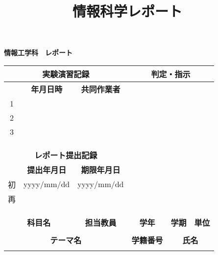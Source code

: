 \documentclass[a4paper]{jsarticle}
\title{情報科学レポート}
\author{}
\begin{document}
{\Huge\begin{center}
  \textbf{情報工学科　レポート}
\end{center}}
\begin{table}[h]
  \centering
  \begingroup
  \renewcommand{\arraystretch}{1.3}
  {\LARGE
  \begin{tabular}{|c|c|c|c|c|c|}
    \hline
    \multicolumn{3}{|c|}{\textbf{実験演習記録}}&\multicolumn{3}{|c|}{\textbf{判定・指示}}\\ \hline
    \hspace{20truemm}&\textbf{年月日時}&\textbf{共同作業者}&\multicolumn{3}{|@{\hspace{6cm}}|}{}\\ \cline{1-3}
    1&&&\multicolumn{3}{|@{\hspace{6cm}}|}{}\\ \cline{1-3}
    2&&&\multicolumn{3}{|@{\hspace{6cm}}|}{}\\ \cline{1-3}
    3&&&\multicolumn{3}{|@{\hspace{6cm}}|}{}\\ \cline{1-3}
    &&&\multicolumn{3}{|@{\hspace{6cm}}|}{}\\ \cline{1-3}
    &&&\multicolumn{3}{|@{\hspace{6cm}}|}{}\\ \cline{1-3}
    &&&\multicolumn{3}{|@{\hspace{6cm}}|}{}\\ \cline{1-3}
    \multicolumn{3}{|c|}{\textbf{レポート提出記録}}&\multicolumn{3}{|@{\hspace{6cm}}|}{}\\ \cline{1-3}
    \hspace{1cm}&\textbf{提出年月日}&\textbf{期限年月日}&\multicolumn{3}{|@{\hspace{6cm}}|}{}\\ \cline{1-3}
    初&yyyy/mm/dd&yyyy/mm/dd&\multicolumn{3}{|@{\hspace{6cm}}|}{}\\ \cline{1-3}
    再&&&\multicolumn{3}{|@{\hspace{6cm}}|}{}\\ \cline{1-3}
    &&&\multicolumn{3}{|@{\hspace{6cm}}|}{}\\ \cline{1-3}
    &&&\multicolumn{3}{|@{\hspace{6cm}}|}{}\\ \cline{1-3}
    &&&\multicolumn{3}{|@{\hspace{6cm}}|}{}\\ \hline
    \multicolumn{2}{|c|}{\textbf{科目名}}&\textbf{担当教員}&\textbf{学年}&\textbf{学期}&\textbf{単位}\\ \hline
    \multicolumn{2}{|c|}{}&&&&\\ \hline
    \multicolumn{3}{|c|}{\textbf{テーマ名}}&\textbf{学籍番号}&\multicolumn{2}{|c|}{\textbf{氏名}}\\ \hline
    \multicolumn{3}{|c|}{}&&\multicolumn{2}{|c|}{}\\ \hline
  \end{tabular}
  }
  \endgroup
\end{table}
\end{document}
